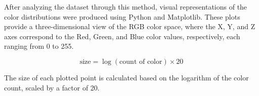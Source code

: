     After analyzing the dataset through this method, visual representations of the color distributions were produced using Python and Matplotlib. These plots provide a three-dimensional view of the RGB color space, where the X, Y, and Z axes correspond to the Red, Green, and Blue color values, respectively, each ranging from 0 to 255. 

    \[
    \text{size} = \log(\text{count of color}) \times 20
    \]

    The size of each plotted point is calculated based on the logarithm of the color count, scaled by a factor of 20.
    
    

        
        
        

